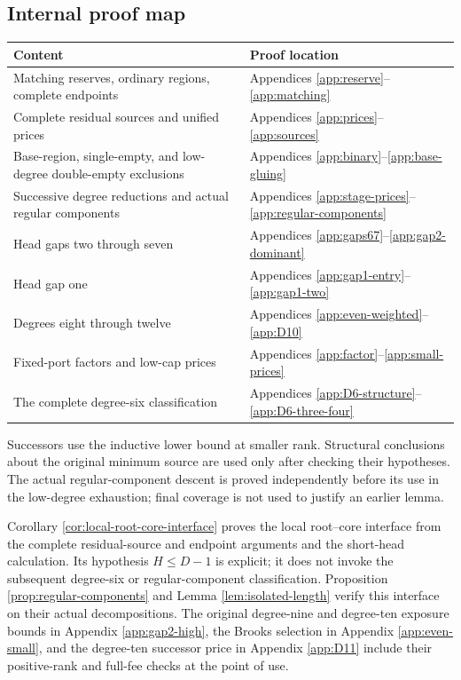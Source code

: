 \documentclass[11pt,a4paper]{article}
\theoremstyle{definition}
\begin{document}
\subsection{Internal proof map}
\begin{longtable}{P{.35\textwidth}P{.55\textwidth}}
\toprule
Content & Proof location\\\midrule\endhead
Matching reserves, ordinary regions, complete endpoints & Appendices \ref{app:reserve}--\ref{app:matching}\\
Complete residual sources and unified prices & Appendices \ref{app:prices}--\ref{app:sources}\\
Base-region, single-empty, and low-degree double-empty exclusions & Appendices \ref{app:binary}--\ref{app:base-gluing}\\
Successive degree reductions and actual regular components & Appendices \ref{app:stage-prices}--\ref{app:regular-components}\\
Head gaps two through seven & Appendices \ref{app:gaps67}--\ref{app:gap2-dominant}\\
Head gap one & Appendices \ref{app:gap1-entry}--\ref{app:gap1-two}\\
Degrees eight through twelve & Appendices \ref{app:even-weighted}--\ref{app:D10}\\
Fixed-port factors and low-cap prices & Appendices \ref{app:factor}--\ref{app:small-prices}\\
The complete degree-six classification & Appendices \ref{app:D6-structure}--\ref{app:D6-three-four}\\
\bottomrule
\end{longtable}
Successors use the inductive lower bound at smaller rank. Structural conclusions about the original minimum source are used only after checking their hypotheses. The actual regular-component descent is proved independently before its use in the low-degree exhaustion; final coverage is not used to justify an earlier lemma.

Corollary \ref{cor:local-root-core-interface} proves the local root--core
interface from the complete residual-source and endpoint arguments and
the short-head calculation. Its hypothesis $H\le D-1$ is explicit;
it does not invoke the subsequent degree-six or regular-component
classification. Proposition \ref{prop:regular-components} and Lemma
\ref{lem:isolated-length} verify this interface on their actual
decompositions. The original degree-nine and degree-ten exposure bounds
in Appendix \ref{app:gap2-high}, the Brooks selection in Appendix
\ref{app:even-small}, and the degree-ten successor price in Appendix
\ref{app:D11} include their positive-rank and full-fee checks at the
point of use.
\end{document}
